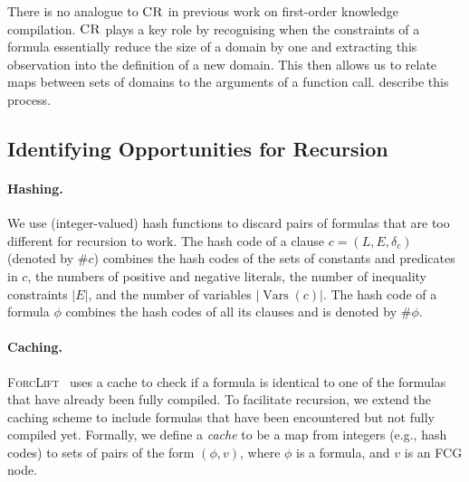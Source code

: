 \documentclass{article}
\theoremstyle{definition}
\theoremstyle{remark}
\DeclareMathOperator{\CR}{\textsc{CR}}
\DeclareMathOperator{\Vars}{Vars}
\begin{document}
There is no analogue to $\CR$ in previous work on first-order knowledge
compilation. $\CR$ plays a key role by recognising when the constraints of a
formula essentially reduce the size of a domain by one and extracting this
observation into the definition of a new domain. This then allows us to relate
maps between sets of domains to the arguments of a function call.
 describe this process.

\subsection{Identifying Opportunities for Recursion}\label{sec:ref}

\paragraph{Hashing.}
We use (integer-valued) hash functions to discard pairs of formulas that are too
different for recursion to work. The hash code of a clause
$c = (L, E, \delta_{c})$ (denoted by $\# c$) combines the hash codes of the sets
of constants and predicates in $c$, the numbers of positive and negative
literals, the number of inequality constraints $|E|$, and the number of
variables $|\Vars(c)|$. The hash code of a formula $\phi$ combines the hash
codes of all its clauses and is denoted by $\#\phi$.

\paragraph{Caching.}
\textsc{ForcLift}~\cite{DBLP:conf/ijcai/BroeckTMDR11} uses a cache to check if
a formula is identical to one of the formulas that have already been fully
compiled. To facilitate recursion, we extend the caching scheme to include
formulas that have been encountered but not fully compiled yet. Formally, we
define a \emph{cache} to be a map from integers (e.g., hash codes) to sets of
pairs of the form $(\phi, v)$, where $\phi$ is a formula, and $v$ is an FCG
node.
\end{document}
